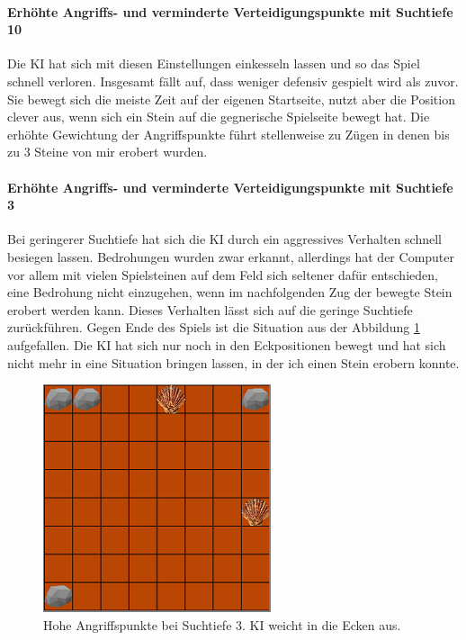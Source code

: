 \paragraph{Erhöhte Angriffs- und verminderte Verteidigungspunkte mit Suchtiefe 10}
Die KI hat sich mit diesen Einstellungen einkesseln lassen und so das Spiel schnell verloren. Insgesamt fällt auf, dass weniger defensiv gespielt wird als zuvor. Sie bewegt sich die meiste Zeit auf der eigenen Startseite, nutzt aber die Position clever aus, wenn sich ein Stein auf die gegnerische Spielseite bewegt hat. Die erhöhte Gewichtung der Angriffspunkte führt stellenweise zu Zügen in denen bis zu 3 Steine von mir erobert wurden.
\paragraph{Erhöhte Angriffs- und verminderte Verteidigungspunkte mit Suchtiefe 3}
Bei geringerer Suchtiefe hat sich die KI durch ein aggressives Verhalten schnell besiegen lassen. Bedrohungen wurden zwar erkannt, allerdings hat der Computer vor allem mit vielen Spielsteinen auf dem Feld sich seltener dafür entschieden, eine Bedrohung nicht einzugehen, wenn im nachfolgenden Zug der bewegte Stein erobert werden kann. Dieses Verhalten lässt sich auf die geringe Suchtiefe zurückführen. Gegen Ende des Spiels ist die Situation aus der Abbildung \ref{fig:nichtschlagbar} aufgefallen. Die KI hat sich nur noch in den Eckpositionen bewegt und hat sich nicht mehr in eine Situation bringen lassen, in der ich einen Stein erobern konnte.
\begin{figure}[h]
	\centering
	\includegraphics{img/Aggro/humannichtzuschlagen2}	
	\caption{Hohe Angriffspunkte bei Suchtiefe 3. KI weicht in die Ecken aus.}
	\label{fig:nichtschlagbar}
\end{figure}
